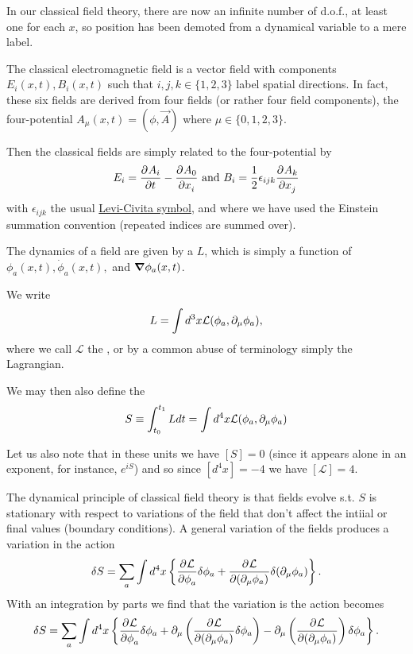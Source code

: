 In our classical field theory, there are now an infinite number of d.o.f., at least one for each $x$, so position has been demoted from a dynamical variable to a mere label.

\begin{exm}
The classical electromagnetic field is a vector field with components $E_i(x,t), B_i(x,t)$ such that $i,j,k\in \{1,2,3\}$ label spatial directions. In fact, these six fields are derived from four fields (or rather four field components), the four-potential $A_\mu(x,t)=(\phi,\vec{A})$ where $\mu\in\{0,1,2,3\}$.

Then the classical fields are simply related to the four-potential by
$$E_i=\P{A_i}{t}-\P{A_0}{x_i} \text{ and } B_i=\frac{1}{2}\epsilon_{ijk} \P{A_k}{x_j}$$
with $\epsilon_{ijk}$ the usual \href{https://en.wikipedia.org/wiki/Levi-Civita_symbol}{Levi-Civita symbol}, and where we have used the Einstein summation convention (repeated indices are summed over).
\end{exm}

The dynamics of a field are given by a  $L$, which is simply a function of $\phi_a(x,t), \dot \phi_a(x,t),$ and $\grad \phi_a(x,t)$. 
\begin{defn}
We write
$$L=\int d^3 x \mathcal{L}(\phi_a, \p_\mu \phi_a),$$
where we call $\mathcal{L}$ the , or by a common abuse of terminology simply the Lagrangian.
\end{defn}
\begin{defn}
We may then also define the 
$$S\equiv \int_{t_0}^{t_1}L dt = \int d^4x \mathcal{L}(\phi_a,\p_\mu \phi_a)$$
\end{defn}
Let us also note that in these units we have $[S]=0$ (since it appears alone in an exponent, for instance, $e^{iS}$) and so since $[d^4x]=-4$ we have $[\mathcal{L}]=4.$

The dynamical principle of classical field theory is that fields evolve s.t. $S$ is stationary with respect to variations of the field that don't affect the intiial or final values (boundary conditions). A general variation of the fields produces a variation in the action
$$\delta S=\sum_a \int d^4 x\left \{ \P{\mathcal{L}}{\phi_a}\delta\phi_a +\P{\mathcal{L}}{(\p_\mu\phi_a)} \delta(\p_\mu \phi_a)\right\}.$$
With an integration by parts we find that the variation is the action becomes
$$\delta S= \sum_a \int d^4x \left\{ \P{\mathcal{L}}{\phi_a}\delta \phi_a +\p_\mu \left( \P{\mathcal{L}}{(\p_\mu \phi_a)}\delta \phi_a\right)-\p_\mu \left(\P{\mathcal{L}}{(\p_\mu \phi_a)}\right)\delta \phi_a\right\}.$$

